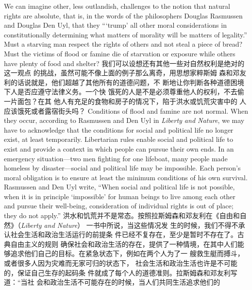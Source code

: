 \begin{paracol}{2}
We can imagine other, less outlandish, challenges to the notion
that natural rights are absolute, that is, in the words of the
philosophers Douglas Rasmussen and Douglas Den Uyl, that
they {``}`trump' all other moral considerations in constitutionally
determining what matters of morality will be matters of legality.'' Must a starving man respect the rights of others and not
steal a piece of bread? Must the victims of flood or famine die of
starvation or exposure while others have plenty of food and
shelter?
\switchcolumn
我们可以设想还有其他一些对自然权利是绝对的这一观点
的挑战，虽然可能不像上面的例子那么离奇，用思想家粹斯姆
森和邓友利的话说就是，他们超越了其他所有的道德问题，不
断地让你判断各种道德困境下人是否应遵守法律义务。一个快
饿死的人是不是必须尊重他人的权利，不去偷一片面包？在其
他人有充足的食物和房子的情况下，陷于洪水或饥荒灾害中的
人应该饿死或者露宿街头吗？
\switchcolumn*
Conditions of flood and famine are not normal. When they
occur, according to Rasmussen and Den Uyl in \textit{Liberty and Nature}, we may have to acknowledge that the conditions for social
and political life no longer exist, at least temporarily. Libertarian rules enable social and political life to exist and provide a
context in which people can pursue their own ends. In an emergency situation---two men fighting for one lifeboat, many people made homeless by disaster---social and political life may be
impossible. Each person's moral obligation is to ensure at least
the minimum conditions of his own survival. Rasmussen and
Den Uyl write, ``When social and political life is not possible,
when it is in principle `impossible' for human beings to live
among each other and pursue their well-being, consideration of
individual rights is out of place; they do not apply.''
\switchcolumn
洪水和饥荒并不是常态。按照拉斯姆森和邓友利在《自由和自然》（\textit{Liberty and Nature}） 一书中所说，当这些情况发
生的时候，我们不得不承认社会生活和政治生活运行的前提条
件已经不复存在，至少是暂时不存在了。古典自由主义的规则
确保社会和政治生活的存在，提供了一种情境，在其中人们能
够追求他们自己的目标。在紧急状态下，例如在两个人为了一
艘救生艇而搏斗，或者很多人因为灾难而无家可归的状态下，
社会生活和政治生活也许是不可能的，保证自己生存的起码条
件就成了每个人的道德准则。拉斯姆森和邓友利写道：“当社
会和政治生活不可能存在的时候，当人们共同生活追求他们的

\end{paracol}
